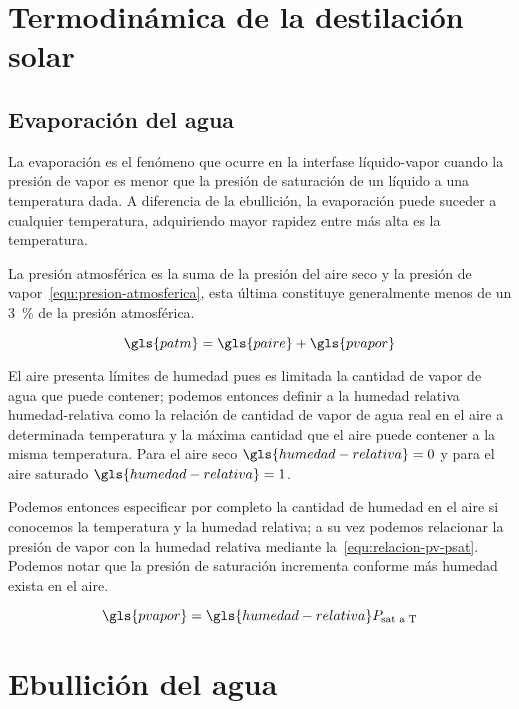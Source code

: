 \section{Termodinámica de la destilación solar}
	
	\subsection{Evaporación del agua}

		La evaporación es el fenómeno que ocurre en la interfase líquido-vapor cuando la presión de vapor es menor que la presión de saturación de un líquido a una temperatura dada. A diferencia de la ebullición, la evaporación puede suceder a cualquier temperatura, adquiriendo mayor rapidez entre más alta es la temperatura. \cite{cengel_transferencia_2010}

		La presión atmosférica es la suma de la presión del aire seco y la presión de vapor~\eqref{equ:presion-atmosferica}, esta última constituye generalmente menos de un \qty{3}{\percent} de la presión atmosférica.

		\begin{equation}\label{equ:presion-atmosferica}
			\gls{patm} = \gls{paire} + \gls{pvapor}
		\end{equation}

		El aire presenta límites de humedad pues es limitada la cantidad de vapor de agua que puede contener; podemos entonces definir a la humedad relativa \gls{humedad-relativa} como la relación de cantidad de vapor de agua real en el aire a determinada temperatura y la máxima cantidad que el aire puede contener a la misma temperatura. Para el aire seco $\gls{humedad-relativa} = 0$ y para el aire saturado $\gls{humedad-relativa} = 1$.

		Podemos entonces especificar por completo la cantidad de humedad en el aire si conocemos la temperatura y la humedad relativa; a su vez podemos relacionar la presión de vapor con la humedad relativa mediante la~\cref{equ:relacion-pv-psat}. Podemos notar que la presión de saturación incrementa conforme más humedad exista en el aire. \cite{cengel_termodinamica_2009}

		\begin{equation}\label{equ:relacion-pv-psat}
			\gls{pvapor} = \gls{humedad-relativa} P_{\text{sat a T}}
		\end{equation}
		
	\section{Ebullición del agua}


